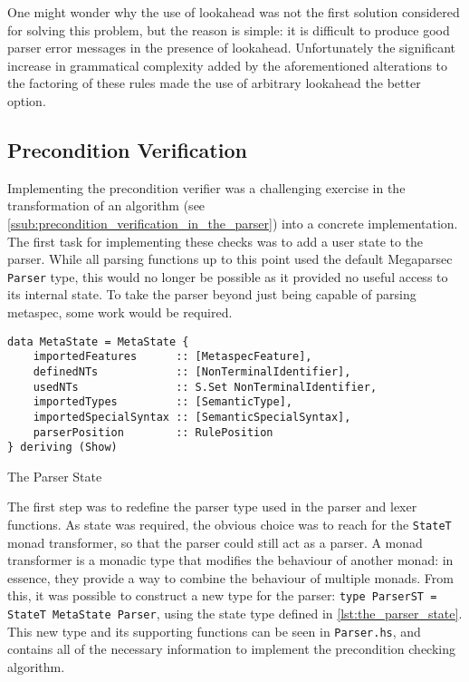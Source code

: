 One might wonder why the use of lookahead was not the first solution considered for solving this problem, but the reason is simple: it is difficult to produce good parser error messages in the presence of lookahead.
Unfortunately the significant increase in grammatical complexity added by the aforementioned alterations to the factoring of these rules made the use of arbitrary lookahead the better option. 



\subsection{Precondition Verification} %
\label{sub:precondition_verification}
Implementing the precondition verifier was a challenging exercise in the transformation of an algorithm (see \autoref{ssub:precondition_verification_in_the_parser}) into a concrete implementation.
The first task for implementing these checks was to add a user state to the parser.
While all parsing functions up to this point used the default Megaparsec \texttt{Parser} type, this would no longer be possible as it provided no useful access to its internal state. 
To take the parser beyond just being capable of parsing \gls{metaspec}, some work would be required. 

\begin{listing}[!htb]
\begin{verbatim}
data MetaState = MetaState {
    importedFeatures      :: [MetaspecFeature],
    definedNTs            :: [NonTerminalIdentifier],
    usedNTs               :: S.Set NonTerminalIdentifier,
    importedTypes         :: [SemanticType],
    importedSpecialSyntax :: [SemanticSpecialSyntax],
    parserPosition        :: RulePosition
} deriving (Show)
\end{verbatim}
\caption{The Parser State}
\label{lst:the_parser_state}
\end{listing}

The first step was to redefine the parser type used in the parser and lexer functions. 
As state was required, the obvious choice was to reach for the \texttt{StateT} monad transformer, so that the parser could still act as a parser. 
A monad transformer is a monadic type that modifies the behaviour of another monad: in essence, they provide a way to combine the behaviour of multiple monads. 
From this, it was possible to construct a new type for the parser: \texttt{type ParserST = StateT MetaState Parser}, using the state type defined in \autoref{lst:the_parser_state}.
This new type and its supporting functions can be seen in \texttt{Parser.hs}, and contains all of the necessary information to implement the precondition checking algorithm.

